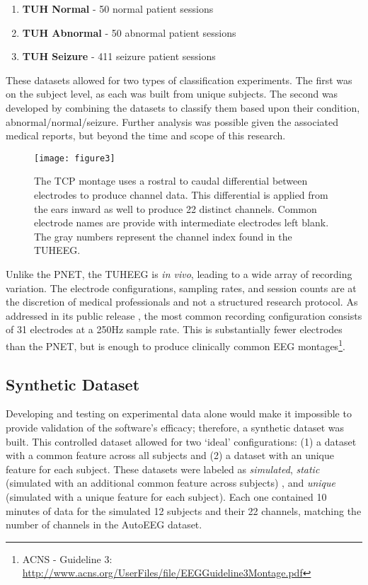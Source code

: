 \begin{enumerate}
\item \textbf{TUH Normal} - 50 normal patient sessions
\item \textbf{TUH Abnormal} - 50 abnormal patient sessions
\item \textbf{TUH Seizure} - 411 seizure patient sessions
\end{enumerate}

These datasets allowed for two types of classification experiments. The first was on the subject level, as each was built from unique subjects. The second was developed by combining the datasets to classify them based upon their condition, abnormal/normal/seizure. Further analysis was possible given the associated medical reports, but beyond the time and scope of this research.

\begin{figure}
\centering
\texttt{[image: figure3]}
\caption[Layout of \acs{TCP} montage for \acs{CEP} features.]{The \acf{TCP} montage uses a rostral to caudal differential between electrodes to produce channel data. This differential is applied from the ears inward as well to produce 22 distinct channels. Common electrode names are provide with intermediate electrodes left blank. The gray numbers represent the channel index found in the \acf{TUHEEG}.}
\label{fig-chap3_tcpMontage}
\end{figure}

Unlike the \ac{PNET}, the \ac{TUHEEG} is \emph{in vivo}, leading to a wide array of recording variation. The electrode configurations, sampling rates, and session counts are at the discretion of medical professionals and not a structured research protocol. As addressed in its public release \cite{Obeid2016a}, the most common recording configuration consists of 31 electrodes at a 250Hz sample rate. This is substantially fewer electrodes than the \ac{PNET}, but is enough to produce clinically common \ac{EEG} montages\footnote{ACNS - Guideline 3: \url{http://www.acns.org/UserFiles/file/EEGGuideline3Montage.pdf} }.

\subsection{Synthetic Dataset}
\label{chap3:syn}

Developing and testing on experimental data alone would make it impossible to provide validation of the software's efficacy; therefore, a synthetic dataset was built. This controlled dataset allowed for two `ideal' configurations: (1) a dataset with a common feature across all subjects and (2) a dataset with an unique feature for each subject. These datasets were labeled as \textit{simulated}, \textit{static} (simulated with an additional common feature across subjects) , and \textit{unique} (simulated with a unique feature for each subject). Each one contained 10 minutes of data for the simulated 12 subjects and their 22 channels, matching the number of channels in the AutoEEG dataset.

